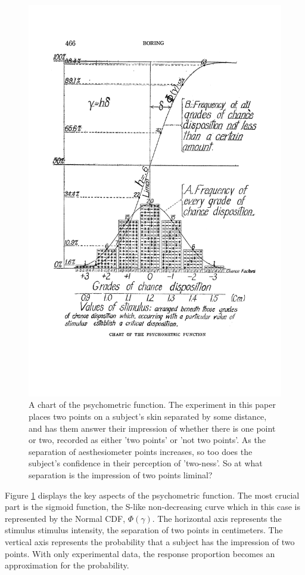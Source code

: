 \documentclass[11pt, oneside, openany]{scrbook}
\begin{document}
\begin{figure}

{\centering \includegraphics[width=0.7\linewidth]{figures/chart_of_pf} 

}

\caption{A chart of the psychometric function. The experiment in this paper places two points on a subject's skin separated by some distance, and has them answer their impression of whether there is one point or two, recorded as either 'two points' or 'not two points'. As the separation of aesthesiometer points increases, so too does the subject's confidence in their perception of 'two-ness'. So at what separation is the impression of two points liminal?}\label{fig:ch020-chart-of-pf}
\end{figure}

Figure \ref{fig:ch020-chart-of-pf} displays the key aspects of the psychometric function. The most crucial part is the sigmoid function, the S-like non-decreasing curve which in this case is represented by the Normal CDF, \(\Phi(\gamma)\). The horizontal axis represents the stimulus stimulus intensity, the separation of two points in centimeters. The vertical axis represents the probability that a subject has the impression of two points. With only experimental data, the response proportion becomes an approximation for the probability.
\end{document}
